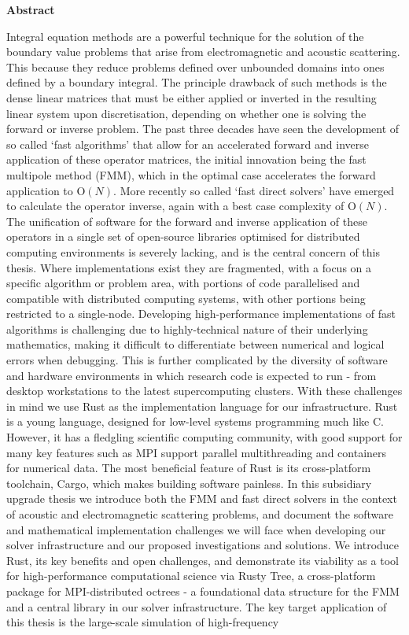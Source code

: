 \thispagestyle{plain}

\begin{center}
    \textbf{Abstract}
\end{center}

Integral equation methods are a powerful technique for the solution of the boundary value problems that arise from electromagnetic and acoustic scattering. This because they reduce problems defined over unbounded domains into ones defined by a boundary integral. The principle drawback of such methods is the dense linear matrices that must be either applied or inverted in the resulting linear system upon discretisation, depending on whether one is solving the forward or inverse problem. The past three decades have seen the development of so called `fast algorithms' that allow for an accelerated forward and inverse application of these operator matrices, the initial innovation being the fast multipole method (FMM), which in the optimal case accelerates the forward application to $\text{O}(N)$. More recently so called `fast direct solvers' have emerged to calculate the operator inverse, again with a best case complexity of $\text{O}(N)$. The unification of software for the forward and inverse application of these operators in a single set of open-source libraries optimised for distributed computing environments is severely lacking, and is the central concern of this thesis. Where implementations exist they are fragmented, with a focus on a specific algorithm or problem area, with portions of code parallelised and compatible with distributed computing systems, with other portions being restricted to a single-node. Developing high-performance implementations of fast algorithms is challenging due to highly-technical nature of their underlying mathematics, making it difficult to differentiate between numerical and logical errors when debugging. This is further complicated by the diversity of software and hardware environments in which research code is expected to run - from desktop workstations to the latest supercomputing clusters. With these challenges in mind we use Rust as the implementation language for our infrastructure. Rust is a young language, designed for low-level systems programming much like C. However, it has a fledgling scientific computing community, with good support for many key features such as MPI support parallel multithreading and containers for numerical data. The most beneficial feature of Rust is its cross-platform toolchain, Cargo, which makes building software painless. In this subsidiary upgrade thesis we introduce both the FMM and fast direct solvers in the context of acoustic and electromagnetic scattering problems, and document the software and mathematical implementation challenges we will face when developing our solver infrastructure and our proposed investigations and solutions. We introduce Rust, its key benefits and open challenges, and demonstrate its viability as a tool for high-performance computational science via Rusty Tree, a cross-platform package for MPI-distributed octrees - a foundational data structure for the FMM and a central library in our solver infrastructure. The key target application of this thesis is the large-scale simulation of high-frequency 